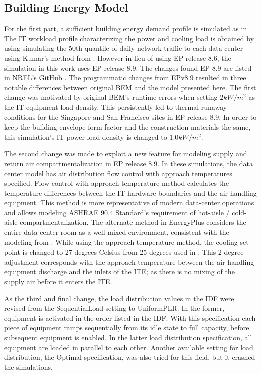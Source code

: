 \subsection{Building Energy Model}
For the first part, a sufficient building energy demand profile is simulated as in \citep{kumar20}.  The IT workload profile characterizing the power and cooling load is obtained by using simulating the 50th quantile of daily network traffic to each data center using Kumar’s method from \citep{kumar20b}.  However in lieu of using EP release 8.6, the simulation in this work uses EP release 8.9. The changes found EP 8.9 are listed in NREL’s GitHub \citep{nrel_git}. The programmatic changes from EPv8.9 resulted in three notable differences between original BEM and the model presented here.  The first change was motivated by original BEM's runtime errors when setting $2kW/m^2$ as the IT equipment load density. This persistently led to thermal runaway conditions for the Singapore and San Francisco sites in EP release 8.9. In order to keep the building envelope form-factor and the construction materials the same, this simulation’s IT power load density is changed to $1.0kW/m^2$.

The second change was made to exploit a new feature for modeling supply and return air compartmentalization in EP release 8.9. In these simulations, the data center model has air distribution flow control with approach temperatures specified. Flow control with approach temperature method calculates the temperature differences between the IT hardware boundaries and the air handling equipment.  This method is more representative of modern data-center operations and allows modeling ASHRAE 90.4 Standard’s requirement of hot-aisle / cold-aisle compartmentalization. The alternate method in EnergyPlus considers the entire data center room as a well-mixed environment, consistent with the modeling from \citep{kumar20}. While using the approach temperature method, the cooling set-point is changed to 27 degrees Celsius from 25 degrees used in \citep{kumar20}. This 2-degree adjustment corresponds with the approach temperature between the air handling equipment discharge and the inlets of the ITE; as there is no mixing of the supply air before it enters the ITE. 

As the third and final change, the load distribution values in the IDF were revised from the SequentialLoad setting to UniformPLR. In the former, equipment is activated in the order listed in the IDF. With this specification each piece of equipment ramps sequentially from its idle state to full capacity, before subsequent equipment is enabled. In the latter load distribution specification, all equipment are loaded in parallel to each other. Another available setting for load distribution, the Optimal specification, was also tried for this field, but it crashed the simulations.

